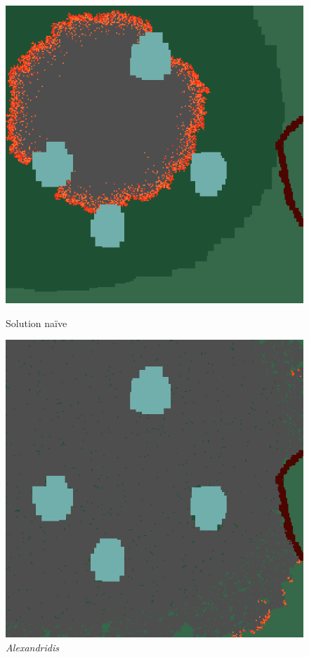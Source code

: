 \documentclass[12pt]{article}
\begin{document}
\begin{figure}[!h]
    \centering
    \begin{minipage}{0.35\textwidth}
      \centering
      \includegraphics[width=.8\linewidth]{pictures/model1/land_200.png}
      \caption{Solution naïve}\label{Fig:Data1}
    \end{minipage}
    \hfil
    \begin{minipage}{0.35\textwidth}
      \centering
      \includegraphics[width=.8\linewidth]{pictures/model2/land_200_nowind.png}
      \caption{\textit{Alexandridis}}\label{Fig:Data2}
    \end{minipage}
 \end{figure}
\end{document}
